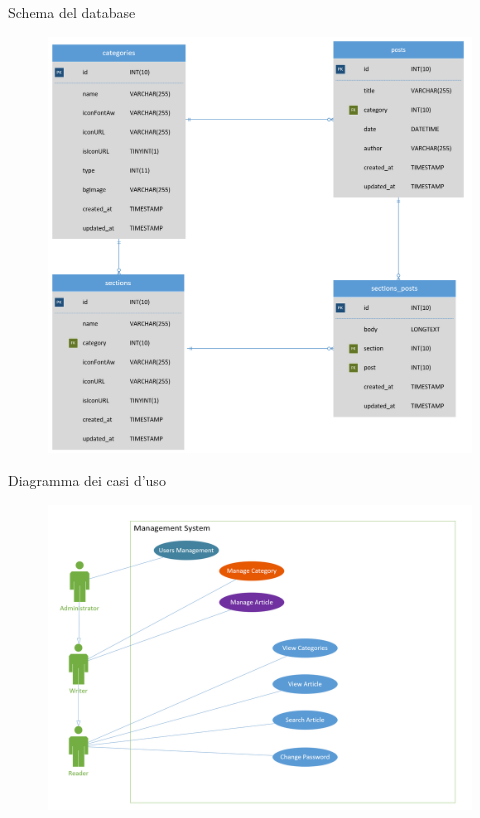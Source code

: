 \documentclass{beamer}
\begin{document}
\begin{frame}{Schema del database}
	\begin{figure}[!h]
		\includegraphics[scale=0.3]{db_schema2.png}
	\end{figure}
\end{frame}

\begin{frame}{Diagramma dei casi d'uso}
	\begin{figure}[!h]
		\includegraphics[scale=0.35]{uml_managementSystem.png}
	\end{figure}
\end{frame}
\end{document}

